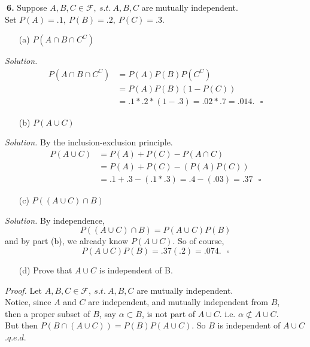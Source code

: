 \documentclass[12pt]{report}
\begin{document}
\pagebreak





\noindent {} $~$\textbf{6.} Suppose $A,B,C\in\mathcal{F},~s.t.~A,B,C$ are mutually independent. \\

Set $P(A)=.1,~P(B)=.2,~P(C)=.3$. 
\begin{itemize}
\item [(a)] $P(A\cap B \cap C^C)$ 		%
\end{itemize}
\textit{Solution.}\\
\begin{align*}
P(A\cap B \cap C^C)&=P(A)P(B)P(C^C) \tag{by independence}\\
&=P(A)P(B)(1-P(C))\\
&=.1*.2*(1-.3)=.02*.7=.014.~~~\square
\end{align*}


\begin{itemize}
\item [(b)] $P(A\cup C)$			%
\end{itemize}
\textit{Solution. } By the inclusion-exclusion principle.
\begin{align*}
P(A\cup C)&=P(A)+P(C)-P(A\cap C) \\
&=P(A)+P(C)-(P(A)P(C))\tag{by independence}\\
&=.1+.3-(.1*.3)=.4-(.03)=.37~~~\square
\end{align*}


\begin{itemize}
\item [(c)] $P((A\cup C)\cap B)$
\end{itemize}
\textit{Solution. } By independence,
$$P((A\cup C)\cap B)=P(A\cup C)P(B)$$
and by part (b), we already know $P(A\cup C)$. So of course,
$$P(A\cup C)P(B)=.37(.2)=.074.~~~\square$$

\begin{itemize}
\item [(d)] Prove that $A\cup C$ is independent of B.
\end{itemize}
\textit{Proof. } Let $A,B,C\in\mathcal{F},~s.t.~A,B,C$ are mutually independent.\\

Notice, since $A$ and $C$ are independent, and mutually independent from $B$, \\
then a proper subset of $B$, say $\alpha \subset B$, is not part of $A\cup C$. i.e. $\alpha \not \subset A\cup C$.\\

But then $P(B\cap(A\cup C))=P(B)P(A\cup C)$. So $B$ is independent of $A\cup C$.\hfill $q.e.d.$

\pagebreak
\end{document}
